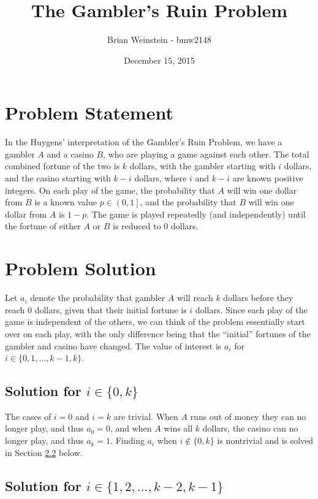 \documentclass[a4paper,11pt]{article}
\title{The Gambler's Ruin Problem}
\author{Brian Weinstein - bmw2148}
\affil{Probability \& Statistics (STAT-W4700), Columbia University, Fall 2015}
\date{December 15, 2015}
\begin{document}
\maketitle

\nocite{*}



\section{Problem Statement}

In the Huygens' interpretation of the Gambler's Ruin Problem, we have a gambler $A$ and a casino $B$, who are playing a game against each other. The total combined fortune of the two is $k$ dollars, with the gambler starting with $i$ dollars, and the casino starting with $k-i$ dollars, where $i$ and $k-i$ are known positive integers. On each play of the game, the probability that $A$ will win one dollar from $B$ is a known value $p\in\left(0,1\right]$, and the probability that $B$ will win one dollar from $A$ is $1-p$. The game is played repeatedly (and independently) until the fortune of either $A$ or $B$ is reduced to 0 dollars.



\section{Problem Solution}
Let $a_i$ denote the probability that gambler $A$ will reach $k$ dollars before they reach 0 dollars, given that their initial fortune is $i$ dollars. Since each play of the game is independent of the others, we can think of the problem essentially start over on each play, with the only difference being that the ``initial'' fortunes of the gambler and casino have changed. The value of interest is $a_i$ for $i\in\{0,1,\ldots,k-1,k\}$.

\subsection{Solution for $i \in \{0,k\}$}
\label{sec:solntrivial}

The cases of $i=0$ and $i=k$ are trivial. When $A$ runs out of money they can no longer play, and thus $a_0=0$, and when $A$ wins all $k$ dollars, the casino can no longer play, and thus $a_k=1$. Finding $a_i$ when $i\not\in\{0,k\}$ is nontrivial and is solved in Section \ref{sec:solnnontrivial} below.

\subsection{Solution for $i \in \{1,2,\ldots,k-2,k-1\}$}
\label{sec:solnnontrivial}
\end{document}
